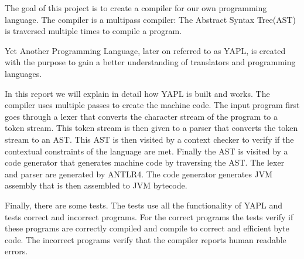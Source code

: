 The goal of this project is to create a compiler for our own programming language. The compiler is a multipass compiler: The Abstract Syntax Tree(AST) is traversed multiple times to compile a program.

Yet Another Programming Language, later on referred to as YAPL, is created with the purpose to gain a better understanding of translators and programming languages. 

In this report we will explain in detail how YAPL is built and works. The compiler uses multiple passes to create the machine code. The input program first goes through a lexer that converts the character stream of the program to a token stream. This token stream is then given to a parser that converts the token stream to an AST. This AST is then visited by a context checker to verify if the contextual constraints of the language are met. Finally the AST is visited by a code generator that generates machine code by traversing the AST.
The lexer and parser are generated by ANTLR4. The code generator generates JVM assembly that is then assembled to JVM bytecode.

Finally, there are some tests. The tests use all the functionality of YAPL and tests correct and incorrect programs. For the correct programs the tests verify if these programs are correctly compiled and compile to correct and efficient byte code. The incorrect programs verify that the compiler reports human readable errors.